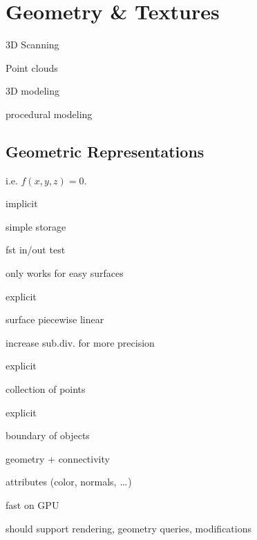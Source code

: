 \section{Geometry \& Textures}
\begin{definition}
  \begin{itemize*}
    \item 3D Scanning
    \item Point clouds
    \item 3D modeling
    \item procedural modeling
  \end{itemize*}
\end{definition}

\subsection{Geometric Representations}

\begin{definition}
  i.e. \(f(x, y , z) = 0\).
  \begin{itemize*}
    \item implicit
    \item simple storage
    \item fst in/out test
    \item only works for easy surfaces
  \end{itemize*}
\end{definition}

\begin{definition}
  \begin{itemize*}
    \item explicit
    \item surface piecewise linear
    \item increase sub.div. for more precision
  \end{itemize*}
\end{definition}

\begin{definition}
  \begin{itemize*}
    \item explicit
    \item collection of points
  \end{itemize*}
\end{definition}

\begin{definition}
  \begin{itemize*}
    \item explicit
    \item boundary of objects
    \item geometry + connectivity
    \item attributes (color, normals, \(\sdots\))
    \item fast on GPU
    \item should support rendering, geometry queries, modifications
  \end{itemize*}
\end{definition}

